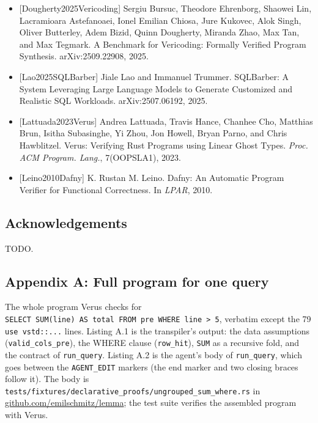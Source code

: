 \documentclass[
]{article}
\begin{document}
\begin{itemize}
  Welleck. AlphaVerus: Bootstrapping Formally Verified Code Generation
  through Self-Improving Translation and Treefinement. In \emph{ICML},
  2025.
\item
  {[}Dougherty2025Vericoding{]} Sergiu Bursuc, Theodore Ehrenborg,
  Shaowei Lin, Lacramioara Astefanoaei, Ionel Emilian Chiosa, Jure
  Kukovec, Alok Singh, Oliver Butterley, Adem Bizid, Quinn Dougherty,
  Miranda Zhao, Max Tan, and Max Tegmark. A Benchmark for Vericoding:
  Formally Verified Program Synthesis. arXiv:2509.22908, 2025.
\item
  {[}Lao2025SQLBarber{]} Jiale Lao and Immanuel Trummer. SQLBarber: A
  System Leveraging Large Language Models to Generate Customized and
  Realistic SQL Workloads. arXiv:2507.06192, 2025.
\item
  {[}Lattuada2023Verus{]} Andrea Lattuada, Travis Hance, Chanhee Cho,
  Matthias Brun, Isitha Subasinghe, Yi Zhou, Jon Howell, Bryan Parno,
  and Chris Hawblitzel. Verus: Verifying Rust Programs using Linear
  Ghost Types. \emph{Proc. ACM Program. Lang.}, 7(OOPSLA1), 2023.
\item
  {[}Leino2010Dafny{]} K. Rustan M. Leino. Dafny: An Automatic Program
  Verifier for Functional Correctness. In \emph{LPAR}, 2010.
\end{itemize}

\subsection{Acknowledgements}\label{acknowledgements}

TODO.

\subsection{Appendix A: Full program for one
query}\label{appendix-a-full-program-for-one-query}

The whole program Verus checks for
\texttt{SELECT\ SUM(line)\ AS\ total\ FROM\ pre\ WHERE\ line\ \textgreater{}\ 5},
verbatim except the 79 \texttt{use\ vstd::...} lines. Listing A.1 is the
transpiler's output: the data assumptions (\texttt{valid\_cols\_pre}),
the WHERE clause (\texttt{row\_hit}), \texttt{SUM} as a recursive fold,
and the contract of \texttt{run\_query}. Listing A.2 is the agent's body
of \texttt{run\_query}, which goes between the \texttt{AGENT\_EDIT}
markers (the end marker and two closing braces follow it). The body is
\texttt{tests/fixtures/declarative\_proofs/ungrouped\_sum\_where.rs} in
\href{https://github.com/emilschmitz/lemma}{github.com/emilschmitz/lemma};
the test suite verifies the assembled program with Verus.
\end{document}
